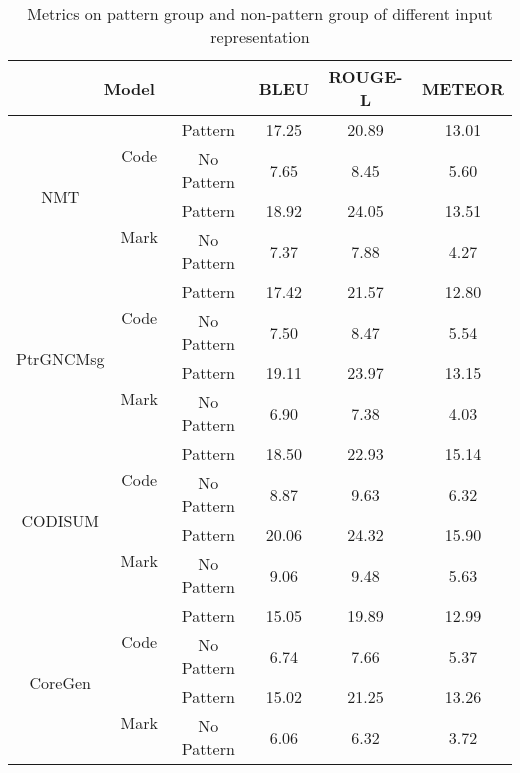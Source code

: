 \begin{table}[htbp]
\caption{Metrics on pattern group and non-pattern group of different input representation}
\begin{tabular}{ccc|ccc}
\toprule
\multicolumn{3}{c|}{Model}&BLEU&ROUGE-L&METEOR\\
\midrule
\multirow{4}{*}{NMT}~&\multirow{2}{*}{Code}&Pattern&17.25&20.89&13.01\\
~&~&No Pattern&7.65&8.45&5.60\\
~&\multirow{2}{*}{Mark}&Pattern&18.92&24.05&13.51\\
~&~&No Pattern&7.37&7.88&4.27\\
\midrule
\multirow{4}{*}{PtrGNCMsg}~&\multirow{2}{*}{Code}&Pattern&17.42&21.57&12.80\\
~&~&No Pattern&7.50&8.47&5.54\\
~&\multirow{2}{*}{Mark}&Pattern&19.11&23.97&13.15\\
~&~&No Pattern&6.90&7.38&4.03\\
\midrule
\multirow{4}{*}{CODISUM}~&\multirow{2}{*}{Code}&Pattern&18.50&22.93&15.14\\
~&~&No Pattern&8.87&9.63&6.32\\
~&\multirow{2}{*}{Mark}&Pattern&20.06&24.32&15.90\\
~&~&No Pattern&9.06&9.48&5.63\\
\midrule
\multirow{4}{*}{CoreGen}~&\multirow{2}{*}{Code}&Pattern&15.05&19.89&12.99\\
~&~&No Pattern&6.74&7.66&5.37\\
~&\multirow{2}{*}{Mark}&Pattern&15.02&21.25&13.26\\
~&~&No Pattern&6.06&6.32&3.72\\
\bottomrule
\end{tabular}
\end{table}

